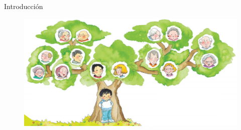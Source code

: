 \begin{frame}[t]{Introducción}\vspace{10pt}

\begin{figure}
	\includegraphics[scale=0.35]{Images/arbol.jpg}
\end{figure}

\end{frame}